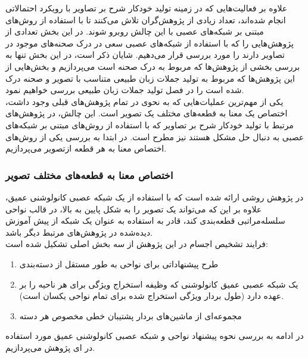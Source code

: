 علاوه بر فعالیت‌هایی که در زمینه تولید خودکار شرح بر تصاویر با رویکرد احتمالاتی انجام شده‌اند، تعداد زیادی از پژوهش‌گران تلاش می‌کنند تا با استفاده از روش‌‌های مبتنی بر شبکه‌های عصبی با این چالش روبرو شوند. در این بخش تعدادی از پژوهش‌هایی را که با استفاده از شبکه‌های عصبی سعی در درک صحنه‌های موجود در تصاویر دارند را مورد بررسی قرار می‌دهیم. شایان ذکر است، در این بخش تنها به بررسی بخشی از پژوهش‌ها که مربوط به درک صحنه است می‌پردازیم و بخش‌هایی از این پژوهش‌ها که مربوط به تولید جملات زبان طبیعی متناسب با تصویر و صحنه درک شده است را در فصل تولید جملات زبان طبیعی بررسی خواهیم نمود.
\\
یکی از مهم‌ترین عملیات‌هایی که به نحوی در تمام پژوهش‌های قبلی وجود داشت، اختصاص یک معنا به قطعه‌های مختلف یک تصویر است. این چالش، در پژوهش‌های مرتبط با تولید خودکار شرح بر تصاویر که با استفاده از روش‌های مبتنی بر شبکه‌های عصبی به دنبال حل مشکل هستند نیز مطرح است. در ابتدا به بررسی یکی از روش‌های اختصاص معنا به هر قطعه ازتصویر می‌پردازیم.

\subsubsection[اختصاص معنا به قطعه‌های مختلف تصویر]{اختصاص معنا به قطعه‌های مختلف تصویر\cite{Girshick_2014_CVPR}}
در پژوهش 
\cite{Girshick_2014_CVPR}
روشی ارائه شده است که با استفاده از یک شبکه عصبی کانولوشنی عمیق، علاوه بر این که می‌تواند یک تصویر را به شکل پایین به بالا، در قالب نواحی سلسله‌مراتبی قطعه‌بندی کند، قادر به استفاده به عنوان یک شبکه از پیش آموزش  دیده‌شده در پژوهش‌های مرتبط دیگر باشد.
\\
فرایند تشخیص اجسام در این پژوهش از سه بخش اصلی تشکیل شده است:
\begin{enumerate}
\item
طرح پیشنهاداتی برای نواحی به طور مستقل از دسته‌بندی
\item 
یک شبکه عصبی عمیق کانولوشنی که وظیفه استخراج ویژگی برای هر ناحیه را بر عهده دارد (طول بردار ويژگی استخراج شده برای تمام نواحی یکسان است).
\item
مجموعه‌ای از ماشین‌های بردار پشتیبان خطی مخصوص هر دسته
\end{enumerate}
در ادامه به بررسی نحوه پیشنهاد نواحی و شبکه عصبی کانولوشنی عمیق مورد استفاده در ای پژوهش می‌پردازیم.

